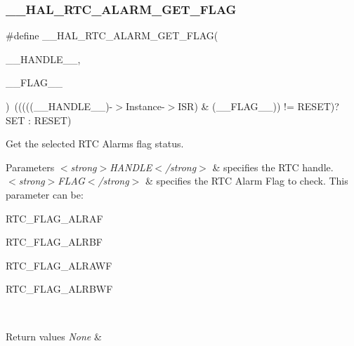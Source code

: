 \subsubsection{\texorpdfstring{\+\_\+\+\_\+\+H\+A\+L\+\_\+\+R\+T\+C\+\_\+\+A\+L\+A\+R\+M\+\_\+\+G\+E\+T\+\_\+\+F\+L\+AG}{\_\_HAL\_RTC\_ALARM\_GET\_FLAG}}
{\footnotesize\ttfamily \#define \+\_\+\+\_\+\+H\+A\+L\+\_\+\+R\+T\+C\+\_\+\+A\+L\+A\+R\+M\+\_\+\+G\+E\+T\+\_\+\+F\+L\+AG(\begin{DoxyParamCaption}\item[{}]{\+\_\+\+\_\+\+H\+A\+N\+D\+L\+E\+\_\+\+\_\+,  }\item[{}]{\+\_\+\+\_\+\+F\+L\+A\+G\+\_\+\+\_\+ }\end{DoxyParamCaption})~(((((\+\_\+\+\_\+\+H\+A\+N\+D\+L\+E\+\_\+\+\_\+)-\/$>$Instance-\/$>$I\+SR) \& (\+\_\+\+\_\+\+F\+L\+A\+G\+\_\+\+\_\+)) != R\+E\+S\+ET)? S\+ET \+: R\+E\+S\+ET)}



Get the selected R\+TC Alarm\textquotesingle{}s flag status. 


\begin{DoxyParams}{Parameters}
{\em $<$strong$>$\+H\+A\+N\+D\+L\+E$<$/strong$>$} & specifies the R\+TC handle. \\
\hline
{\em $<$strong$>$\+F\+L\+A\+G$<$/strong$>$} & specifies the R\+TC Alarm Flag to check. This parameter can be\+: \begin{DoxyItemize}
\item R\+T\+C\+\_\+\+F\+L\+A\+G\+\_\+\+A\+L\+R\+AF \item R\+T\+C\+\_\+\+F\+L\+A\+G\+\_\+\+A\+L\+R\+BF \item R\+T\+C\+\_\+\+F\+L\+A\+G\+\_\+\+A\+L\+R\+A\+WF \item R\+T\+C\+\_\+\+F\+L\+A\+G\+\_\+\+A\+L\+R\+B\+WF \end{DoxyItemize}
\\
\hline
\end{DoxyParams}

\begin{DoxyRetVals}{Return values}
{\em None} & \\
\hline
\end{DoxyRetVals}
\mbox{\label{group___r_t_c___exported___macros_gaf748b95b91cca959f79f441a90678c60}} 
